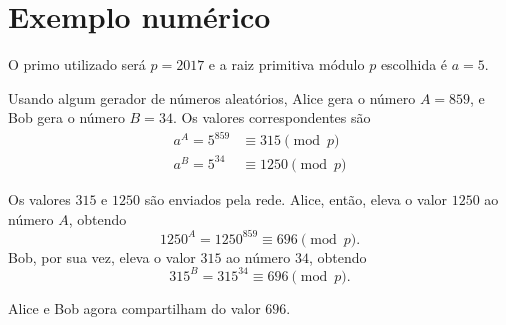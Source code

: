 \documentclass{article}
\begin{document}
\section{Exemplo numérico}

O primo utilizado será $p = 2017$
e a raiz primitiva módulo $p$ escolhida é $a = 5$.

Usando algum gerador de números aleatórios,
Alice gera o número $A = 859$,
e Bob gera o número $B = 34$.
Os valores correspondentes são
\begin{align*}
    a^A = 5^{859} &\equiv 315 \pmod p \\
    a^B = 5^{34} &\equiv 1250 \pmod p
\end{align*}

Os valores $315$ e $1250$ são enviados pela rede.
Alice, então,
eleva o valor $1250$ ao número $A$, obtendo
\begin{equation*}
    1250^A = 1250^{859} \equiv 696 \pmod p.
\end{equation*}
Bob, por sua vez,
eleva o valor $315$ ao número $34$, obtendo
\begin{equation*}
    315^B = 315^{34} \equiv 696 \pmod p.
\end{equation*}

Alice e Bob agora compartilham do valor $696$.
\end{document}
